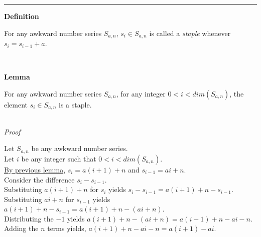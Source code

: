 \documentclass[a4paper,12pt]{article}
\begin{document}
\begin{center}
\noindent\rule{8cm}{0.4pt}
\end{center}




\label{definition:staple}
\hypertarget{definition:staple}{}
\begin{tcolorbox}
\textbf{Definition}

For any awkward number series $S_{a,n}$, $s_i \in S_{a, n}$ is called a \textit{staple} whenever $s_i = s_{i - 1} + a$.

\end{tcolorbox}
\noindent \\






\label{lemma:initial_staples}
\hypertarget{lemma:initial_staples}{}
\begin{tcolorbox}
\textbf{Lemma}

For any awkward number series $S_{a,n}$, for any integer $0 < i < dim(S_{a,n})$, the element $s_i \in S_{a,n}$ is a staple.

\end{tcolorbox}

\noindent \\
\textit{Proof}

\noindent Let $S_{a, n}$ be any awkward number series.\\

\noindent Let $i$ be any integer such that $0 < i < dim(S_{a, n})$.\\

\noindent \hyperlink{lemma:basis_lengths}{By previous lemma}, $s_i = a(i + 1) + n$ and $s_{i - 1} = ai + n$.\\

\noindent Consider the difference $s_i - s_{i - 1}$.\\

\noindent Substituting $a(i + 1) + n$ for $s_i$ yields $s_i - s_{i - 1} = a(i + 1) + n - s_{i - 1}$.\\

\noindent Substituting $ai + n$ for $s_{i - 1}$ yields $a(i + 1) + n - s_{i - 1} = a(i + 1) + n - (ai + n)$.\\

\noindent Distributing the $-1$ yields $a(i + 1) + n - (ai + n) = a(i + 1) + n - ai - n$.\\

\noindent Adding the $n$ terms yields, $a(i + 1) + n - ai - n = a(i + 1) - ai$.\\
\end{document}
